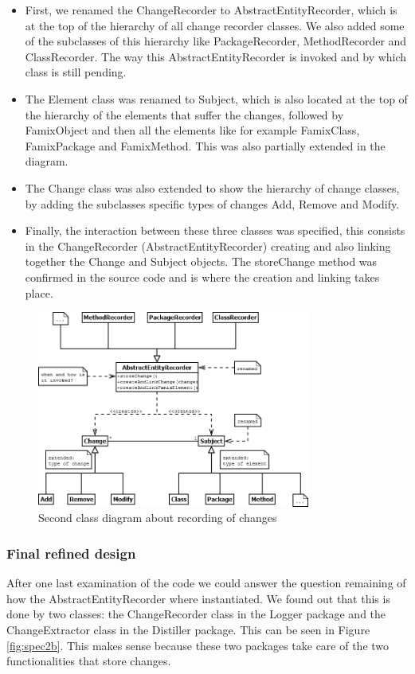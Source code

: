 \documentclass[a4paper]{article}
\begin{document}
\begin{itemize}
\item First, we renamed the ChangeRecorder to AbstractEntityRecorder, which is at the top of the hierarchy of all change recorder classes. We also added some of the subclasses of this hierarchy like PackageRecorder, MethodRecorder and ClassRecorder. The way this AbstractEntityRecorder is invoked and by which class is still pending.

\item The Element class was renamed to Subject, which is also located at the top of the hierarchy of the elements that suffer the changes, followed by FamixObject and then all the elements like for example FamixClass, FamixPackage and FamixMethod. This was also partially extended in the diagram.

\item The Change class was also extended to show the hierarchy of change classes, by adding the subclasses specific types of changes Add, Remove and Modify.

\item Finally, the interaction between these three classes was specified, this consists in the ChangeRecorder (AbstractEntityRecorder) creating and also linking together the Change and Subject objects. The storeChange method was confirmed in the source code and is where the creation and linking takes place.
\end{itemize}

\begin{figure}[h]
\centering
\includegraphics[width=0.8\textwidth]{Images/spec1}
\caption{Second class diagram about recording of changes}
\label{fig:spec1}
\end{figure}

\subsubsection{Final refined design}
\label{sec:finalDesign}
After one last examination of the code we could answer the question remaining of how the AbstractEntityRecorder where instantiated. We found out that this is done by two classes: the ChangeRecorder class in the Logger package and the ChangeExtractor class in the Distiller package. This can be seen in Figure \ref{fig:spec2b}. This makes sense because these two packages take care of the two functionalities that store changes.
\end{document}
